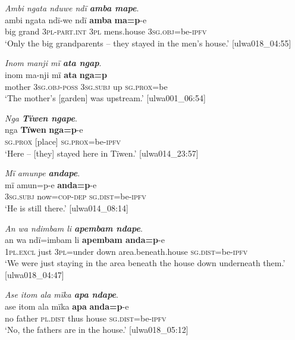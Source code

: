 \ea%
    \label{ex:pred:7}
            \textit{Ambi ngata nduwe ndï \textbf{amba mape}}.\\
\gll ambi  ngata  ndï-we      ndï    \textbf{amba}      \textbf{ma=p}-e\\
    big    grand  \textsc{3pl-part.int}  3\textsc{pl}    mens.house  3\textsc{sg.obj}=be-\textsc{ipfv}\\
\glt `Only the big grandparents – they stayed in the men’s house.’ [ulwa018\_04:55]
\z

\ea%
    \label{ex:pred:8}
            \textit{Inom manji mï \textbf{ata ngap}}.\\
\gll inom  ma-nji      mï      \textbf{ata}  \textbf{nga=p}\\
    mother  3\textsc{sg.obj-poss}  3\textsc{sg.subj}  up  \textsc{sg.prox}=be\\
\glt `The mother’s [garden] was upstream.’ [ulwa001\_06:54]
\z

\ea%
    \label{ex:pred:9}
            \textit{Nga \textbf{Tïwen ngape}}.\\
\gll nga      \textbf{Tïwen}  \textbf{nga=p}-e\\
    \textsc{sg.prox}  [place]  \textsc{sg.prox}=be-\textsc{ipfv}\\
\glt `Here -- [they] stayed here in Tïwen.’ [ulwa014\_23:57]
\z

\ea%
    \label{ex:pred:10}
          \textit{Mï amunpe} \textbf{\textit{andape}}.\\
\gll   mï      amun=p-e    \textbf{anda=p}-e\\
    3\textsc{sg.subj}  now=\textsc{cop-dep}  \textsc{sg.dist}=be-\textsc{ipfv}\\
\glt `He is still there.’ [ulwa014\_08:14]
\z

\ea%
    \label{ex:pred:11}
          \textit{An wa ndimbam li \textbf{apembam ndape}}.\\
\gll an      wa    ndï=imbam  li    \textbf{apembam anda=p}-e\\
    1\textsc{pl.excl}  just    3\textsc{pl}=under    down  area.beneath.house    \textsc{sg.dist}=be-\textsc{ipfv}\\
\glt `We were just staying in the area beneath the house down underneath them.’ [ulwa018\_04:47]
\z

\ea%
    \label{ex:pred:12}
          \textit{Ase itom ala mïka \textbf{apa ndape}}.\\
\gll ase  itom  ala      mïka  \textbf{apa}  \textbf{anda=p}-e\\
    no  father  \textsc{pl.dist}  thus  house  \textsc{sg.dist}=be-\textsc{ipfv}\\
\glt `No, the fathers are in the house.’ [ulwa018\_05:12]
\z

